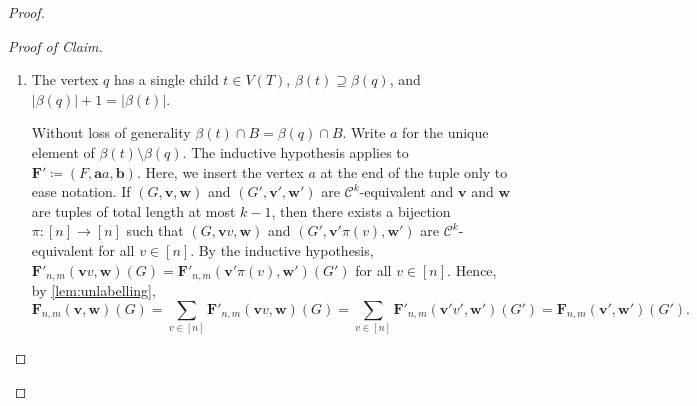 \documentclass[10pt,a4paper]{article}
\theoremstyle{definition}
\theoremstyle{plain}
\theoremstyle{remark}
\newenvironment{claimproof}[1][Proof of Claim]{\begin{proof}[#1] \renewcommand{\qedsymbol}{$\lrcorner$}}{ \end{proof}}
\begin{document}
\begin{proof}
\begin{claimproof}
\begin{enumerate}
				Define $F'$ as the subgraph of $F$ induced by $\bigcup_{s \in V(T) \setminus \{q\}} \beta(s)$.
				Suppose without loss of generality that $\beta(q) \cap B = \beta(t) \cap B$.
				Let $i \in [\ell]$ be such that $a_i \not\in \beta(t)$.
				Then $\boldsymbol{F}' \coloneqq (F', \boldsymbol{a}[i/], \boldsymbol{b})$ is a graph to which the inductive hypothesis applies.
				
				If $(G, \boldsymbol{v}, \boldsymbol{w})$ and $(G', \boldsymbol{v}', \boldsymbol{w}')$ are $\mathcal{C}^k$-equivalent,
				then so are $(G, \boldsymbol{v}[i/], \boldsymbol{w})$ and $(G', \boldsymbol{v}'[i/], \boldsymbol{w}')$.
				By the inductive hypothesis,
				$\boldsymbol{F}'_{n,m}(\boldsymbol{v}[i/], \boldsymbol{w})(G) = \boldsymbol{F}'_{n,m}(\boldsymbol{v}'[i/], \boldsymbol{w}')(G')$.

				Now $\boldsymbol{F}$ differs from $\boldsymbol{F}'$ only in the vertex $a_i$ and the potential edges connecting $a_i$ to the vertices in $\boldsymbol{b}$.
				More precisely,
				\[
					\boldsymbol{F}_{n,m}(\boldsymbol{v}, \boldsymbol{w})(G)
					= \boldsymbol{F}'_{n,m}(\boldsymbol{v}[i/], \boldsymbol{w})(G) \cdot \prod_{a_ib_j \in E(F)} G(v_i w_j).
				\]
				Since $(G, \boldsymbol{v}, \boldsymbol{w})$ and $(G', \boldsymbol{v}', \boldsymbol{w}')$ are $\mathcal{C}^k$-equivalent, $G(v_i w_j) = G'(v'_i w'_j)$ for all $i \in [\ell]$ and $j \in [r]$.
				This implies the claim.
				
				\item The vertex $q$ has a single child $t \in V(T)$, $\beta(t) \supseteq \beta(q)$, and $|\beta(q)|+1 = |\beta(t)|$.
				
				Without loss of generality $\beta(t) \cap B = \beta(q) \cap B$. Write $a$ for the unique element of $\beta(t) \setminus \beta(q)$. 
				The inductive hypothesis applies to $\boldsymbol{F}' \coloneqq (F, \boldsymbol{a}a, \boldsymbol{b})$.
				Here, we insert the vertex $a$ at the end of the tuple only to ease notation.
				If  $(G, \boldsymbol{v}, \boldsymbol{w})$ and $(G', \boldsymbol{v}', \boldsymbol{w}')$ are $\mathcal{C}^k$-equivalent and $\boldsymbol{v}$ and $\boldsymbol{w}$ are tuples of total length at most $k-1$,
				then there exists a bijection $\pi \colon [n] \to [n]$ such that 
				$(G, \boldsymbol{v}v, \boldsymbol{w})$ and $(G', \boldsymbol{v}'\pi(v), \boldsymbol{w}')$ are $\mathcal{C}^k$-equivalent for all $v \in [n]$.
				By the inductive hypothesis,
				$\boldsymbol{F}'_{n,m}(\boldsymbol{v}v, \boldsymbol{w})(G) = \boldsymbol{F}'_{n,m}(\boldsymbol{v}'\pi(v), \boldsymbol{w}')(G')$ for all $v \in [n]$.
				Hence, by \cref{lem:unlabelling},
				\[
					\boldsymbol{F}_{n,m}(\boldsymbol{v}, \boldsymbol{w})(G)	
					= \sum_{v \in [n]} \boldsymbol{F}'_{n,m}(\boldsymbol{v}v, \boldsymbol{w})(G)	
					= \sum_{v \in [n]} \boldsymbol{F}'_{n,m}(\boldsymbol{v}'v', \boldsymbol{w}')(G')
					= 	\boldsymbol{F}_{n,m}(\boldsymbol{v}', \boldsymbol{w}')(G').	
				\]
				

\end{enumerate}
\end{claimproof}
\end{proof}
\end{document}
